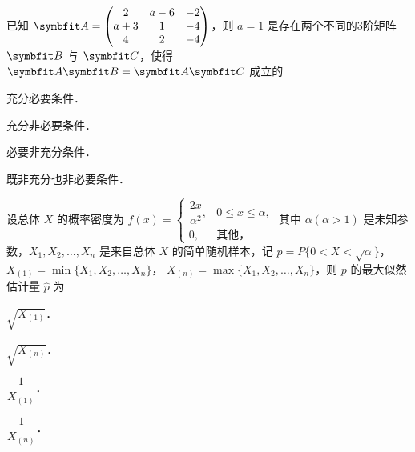 \begin{question}[index=7]
已知 $\symbfit A=\begin{pmatrix}2&a-6&-2\\a+3&1&-4\\4&2&-4\end{pmatrix}$，则 $a=1$ 是存在两个不同的3阶矩阵 $\symbfit B$ 与 $\symbfit C$，使得 $\symbfit A\symbfit B=\symbfit A\symbfit C$ 成立的
\begin{choices}[columns=2]
\item 充分必要条件．
\item 充分非必要条件．
\item 必要非充分条件．
\item 既非充分也非必要条件．
\end{choices}
\end{question}
\QuestionBreak

\begin{question}[index=8]
设总体 $X$ 的概率密度为
$f(x)=\begin{cases}\dfrac{2x}{\alpha^2},&0\leq x\leq\alpha,\\0,&\text{其他，}\end{cases}$
其中 $\alpha(\alpha>1)$ 是未知参数，$X_1,X_2,\ldots,X_n$ 是来自总体 $X$ 的简单随机样本，记 $p=P\{0<X<\sqrt{\alpha}\}$，
$X_{(1)}=\min\{X_1,X_2,\ldots,X_n\}$，
$X_{(n)}=\max\{X_1,X_2,\ldots,X_n\}$，则 $p$ 的最大似然估计量 $\hat p$ 为
\begin{choices}[columns=4,label-pos=left]
\item $\sqrt{X_{(1)}}$．
\item $\sqrt{X_{(n)}}$．
\item $\dfrac{1}{X_{(1)}}$．
\item $\dfrac{1}{X_{(n)}}$．
\end{choices}
\end{question}
\QuestionBreak

